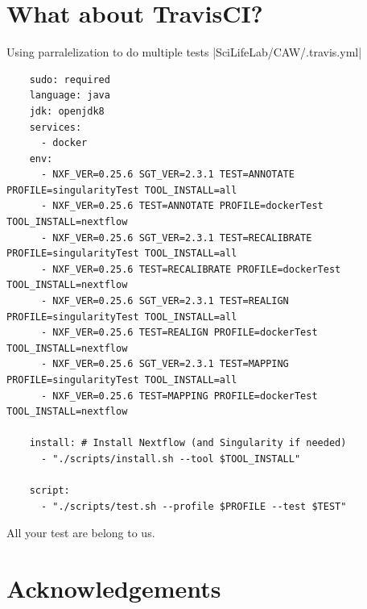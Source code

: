 \documentclass{beamer}
\begin{document}
\section{What about TravisCI?}

\begin{frame}[fragile]{Using parralelization to do multiple tests}
|SciLifeLab/CAW/.travis.yml|
\begin{verbatim}
	sudo: required
	language: java
	jdk: openjdk8
	services:
	  - docker
	env:
	  - NXF_VER=0.25.6 SGT_VER=2.3.1 TEST=ANNOTATE PROFILE=singularityTest TOOL_INSTALL=all
	  - NXF_VER=0.25.6 TEST=ANNOTATE PROFILE=dockerTest TOOL_INSTALL=nextflow
	  - NXF_VER=0.25.6 SGT_VER=2.3.1 TEST=RECALIBRATE PROFILE=singularityTest TOOL_INSTALL=all
	  - NXF_VER=0.25.6 TEST=RECALIBRATE PROFILE=dockerTest TOOL_INSTALL=nextflow
	  - NXF_VER=0.25.6 SGT_VER=2.3.1 TEST=REALIGN PROFILE=singularityTest TOOL_INSTALL=all
	  - NXF_VER=0.25.6 TEST=REALIGN PROFILE=dockerTest TOOL_INSTALL=nextflow
	  - NXF_VER=0.25.6 SGT_VER=2.3.1 TEST=MAPPING PROFILE=singularityTest TOOL_INSTALL=all
	  - NXF_VER=0.25.6 TEST=MAPPING PROFILE=dockerTest TOOL_INSTALL=nextflow

	install: # Install Nextflow (and Singularity if needed)
	  - "./scripts/install.sh --tool $TOOL_INSTALL"

	script:
	  - "./scripts/test.sh --profile $PROFILE --test $TEST"
\end{verbatim}
\end{frame}

\begin{frame}{All your test are belong to us.}
\end{frame}


\section{Acknowledgements}
\end{document}
